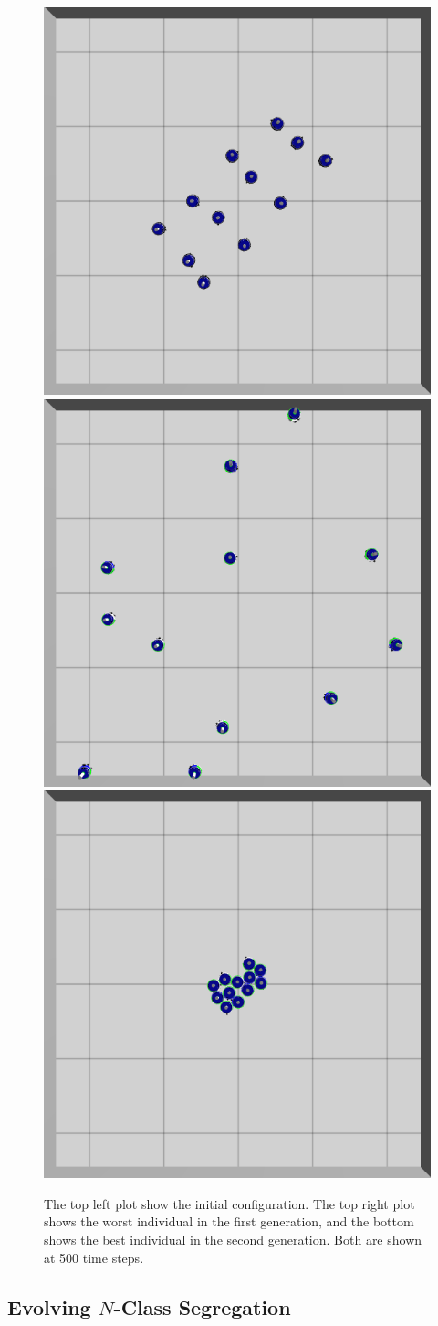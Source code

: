 \documentclass[conference]{IEEEtran}
\begin{document}
  \begin{figure}
    \centering
    \includegraphics[width=0.49\linewidth]{./images/0_steps.png}
    \includegraphics[width=0.49\linewidth]{./images/500_steps_individual_4_generation_0.png}
    \includegraphics[width=0.49\linewidth]{./images/500_steps_individual_0_generation_2.png}
    \caption{The top left plot show the initial configuration. The top right plot shows the worst individual in the first generation, and the bottom shows the best individual in the second generation. Both are shown at 500 time steps.}
    \label{fig:evolved_aggregation}
  \end{figure}

  \subsection{Evolving $N$-Class Segregation}
\end{document}
